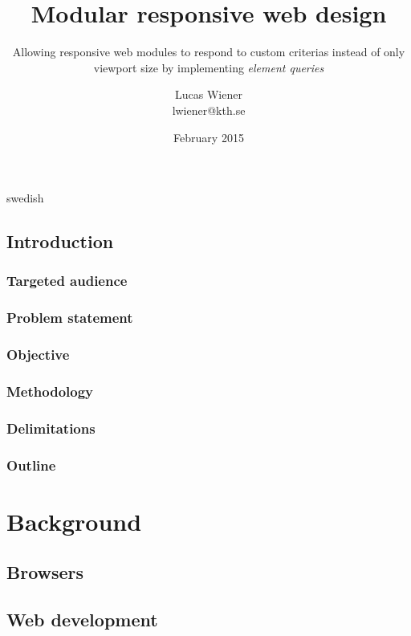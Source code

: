 \documentclass[a4paper,11pt]{kth-mag}
\title{Modular responsive web design}
\subtitle{Allowing responsive web modules to respond to custom criterias instead of only viewport size by implementing \emph{element queries}}
\author{Lucas Wiener \\ \lowercase{lwiener@kth.se}}
\date{February 2015}
\begin{document}
\frontmatter
\pagestyle{empty}
\removepagenumbers
\maketitle
{}
\begin{abstract}
\end{abstract}
\clearpage
\begin{foreignabstract}{swedish}
\end{foreignabstract}
\clearpage
\tableofcontents*
\mainmatter
\pagestyle{newchap}
\chapter{Introduction}

\section{Targeted audience}

\section{Problem statement}

\section{Objective}

\section{Methodology}

\section{Delimitations}

\section{Outline}

\part{Background}

\chapter{Browsers}

\chapter{Web development}
\end{document}
